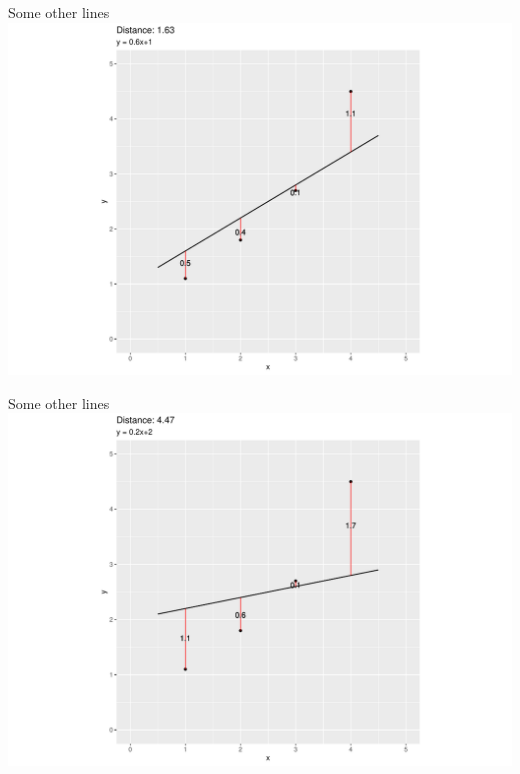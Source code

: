 \documentclass[
  ignorenonframetext,
]{beamer}
\begin{document}
\begin{frame}{Some other lines}
\protect\hypertarget{some-other-lines-1}{}
\includegraphics{1_files/figure-beamer/unnamed-chunk-10-1.pdf}
\end{frame}

\begin{frame}{Some other lines}
\protect\hypertarget{some-other-lines-2}{}
\includegraphics{1_files/figure-beamer/unnamed-chunk-11-1.pdf}
\end{frame}
\end{document}
